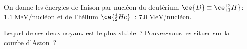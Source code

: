 On donne les énergies de liaison par nucléon du deutérium
$\ce{D}\equiv\ce{_{1}^{2}H}$: $\qty{1.1}{\MeV\per\mathrm{nucléon}}$ et de l'hélium
$\ce{_{2}^{4}He}$~: $\qty{7.0}{\MeV\per\mathrm{nucléon}}$.

Lequel de ces deux noyaux est le plus stable~? Pouvez-vous les situer sur la
courbe d'Aston~?


